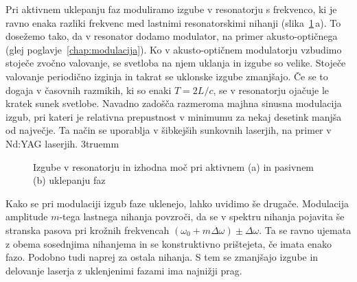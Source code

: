 Pri aktivnem uklepanju faz moduliramo izgube v resonatorju
s frekvenco, ki je ravno enaka razliki 
frekvenc med lastnimi resonatorskimi nihanji (slika~\ref{fig:aktpas}\,a). 
To dosežemo tako, da v resonator dodamo
modulator, na primer akusto-optičnega (glej poglavje~\ref{chap:modulacija}).
Ko v akusto-optičnem modulatorju vzbudimo stoječe zvočno valovanje, se 
svetloba na njem uklanja in izgube so velike. Stoječe valovanje periodično izginja
in takrat se uklonske izgube zmanjšajo. Če se to dogaja v časovnih
razmikih, ki so enaki $T=2L/c$, se v resonatorju ojačuje le kratek sunek svetlobe. 
Navadno zadošča razmeroma majhna sinusna modulacija izgub, pri kateri je relativna 
prepustnost v minimumu za nekaj desetink manjša od največje. Ta način se uporablja
v šibkejših sunkovnih laserjih, na primer v Nd:YAG laserjih.
\vglue3truemm
\begin{figure}[ht]
\centering
\def\svgwidth{128truemm} 

\caption{Izgube v resonatorju in izhodna moč pri aktivnem (a) in pasivnem (b) uklepanju faz}
\label{fig:aktpas}
\end{figure}

Kako se pri modulaciji izgub faze uklenejo, lahko uvidimo še drugače.
Modulacija amplitude $m$-tega lastnega nihanja povzroči, da se v spektru nihanja
pojavita še stranska pasova pri krožnih frekvencah $(\omega_0 + m\Delta \omega) \pm \Delta\omega$. Ta se ravno ujemata z obema sosednjima nihanjema in se konstruktivno
prištejeta, če imata enako fazo. Podobno tudi naprej za ostala nihanja. 
S tem se zmanjšajo izgube in delovanje laserja z uklenjenimi fazami ima najnižji prag. 

